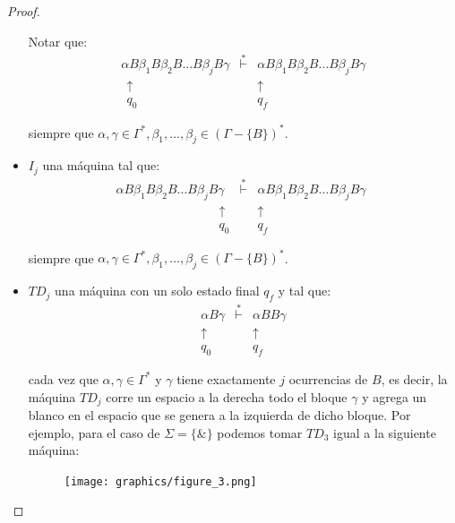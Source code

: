 \begin{proof}
\begin{itemize}
        \PN Notar que:
    		\[
    		  \begin{array}{lcr}
            \alpha B \beta_{1} B \beta_{2} B \dotsc B \beta_{j} B \gamma &\overset{\ast}{\vdash}& \alpha B \beta_{1} B
              \beta_{2} B \dotsc B \beta_{j} B \gamma \\
            \ \ \uparrow && \uparrow \ \ \\
            \ \ q_{0} && q_{f} \ \
          \end{array}
    		\]

        \PN siempre que $\alpha, \gamma \in \Gamma ^{\ast}, \beta_{1}, \dotsc, \beta_{j} \in (\Gamma -\{B\})^{\ast}$.

      \item $I_{j}$ una máquina tal que:
    		\[
    		  \begin{array}{lcr}
            \alpha B \beta_{1} B
            \beta_{2} B \dotsc B \beta_{j} B \gamma &\overset{\ast}{\vdash}&  \alpha B \beta_{1} B \beta_{2} B \dotsc B
            \beta_{j} B \gamma \\
            \qquad\qquad\qquad\qquad \ \uparrow && \uparrow \qquad\qquad\qquad\qquad \ \\
            \qquad\qquad\qquad\qquad \ q_{0} && q_{f} \qquad\qquad\qquad\qquad \
          \end{array}
    		\]

        \PN siempre que $\alpha, \gamma \in \Gamma ^{\ast}, \beta_{1}, \dotsc, \beta_{j} \in (\Gamma -\{B\})^{\ast}$.

      \item $TD_{j}$ una máquina con un solo estado final $q_{f}$ y tal que:
    		\[
          \begin{array}{ccc}
            \alpha B \gamma &\overset{\ast}{\vdash} &\alpha B B \gamma \\
            \uparrow && \uparrow \ \ \\
            q_{0} & & q_{f} \ \
          \end{array}
        \]

        \PN cada vez que $\alpha, \gamma \in \Gamma^{\ast}$ y $\gamma$ tiene exactamente $j$ ocurrencias de $B$, es
        decir, la máquina $TD_{j}$ corre un espacio a la derecha todo el bloque $\gamma$ y agrega un blanco en el
        espacio que se genera a la izquierda de dicho bloque. Por ejemplo, para el caso de $\Sigma =\{\&\}$ podemos
        tomar $TD_{3}$ igual a la siguiente máquina:

        \begin{figure}[h]
          \centering
          \texttt{[image: graphics/figure\_3.png]}
        \end{figure}


\end{itemize}
\end{proof}
